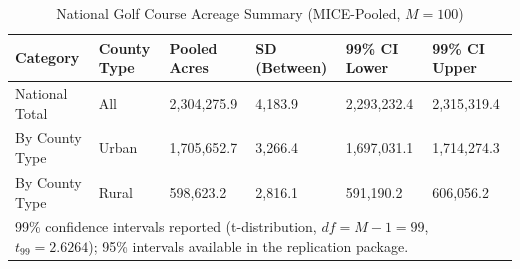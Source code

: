 \begin{table}[!h]
\centering
\caption{\label{tab:acreage_summary}National Golf Course Acreage Summary (MICE-Pooled, $M = 100$)}
\centering
\begin{tabular}[t]{llllll}
\toprule
Category & County Type & Pooled Acres & SD (Between) & 99\% CI Lower & 99\% CI Upper\\
\midrule
National Total & All & 2,304,275.9 & 4,183.9 & 2,293,232.4 & 2,315,319.4\\
By County Type & Urban & 1,705,652.7 & 3,266.4 & 1,697,031.1 & 1,714,274.3\\
By County Type & Rural & 598,623.2 & 2,816.1 & 591,190.2 & 606,056.2\\
\bottomrule
\multicolumn{6}{l}{\rule{0pt}{1em}99\% confidence intervals reported (t-distribution, $df = M-1 = 99$, $t_{99} = 2.6264$); 95\% intervals available in the replication package.}\\
\end{tabular}
\end{table}
